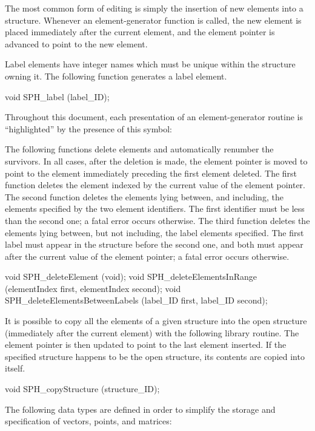\newpar
The most common form of editing is simply the insertion of new elements into a
structure.  Whenever an element-generator function is called, the new element
is placed immediately after the current element, and the element pointer is
advanced to point to the new element.

\newpar
Label elements have integer names which must be unique within the 
structure owning it.  The following function generates a label element.

\begincode
void SPH_label (label_ID);   \elementgenerator
\endcode

Throughout this document, each presentation of an element-generator routine is
``highlighted'' by the presence of this symbol:  \elementgenerator

\newpar
The following functions delete elements and automatically renumber the
survivors.  In all cases, after the deletion is made, the element pointer is
moved to point to the element immediately preceding the first element deleted.
The first function deletes the element indexed by the current value of the
element pointer.  The second function deletes the elements lying between, and
including, the elements specified by the two element identifiers.  The first
identifier must be less than the second one; a fatal error occurs otherwise.
The third function deletes the elements lying between, but not including, the
label elements specified.  The first label must appear in the structure before
the second one, and both must appear after the current value of the element
pointer; a fatal error occurs otherwise.

\begincode
void SPH_deleteElement (void);
void SPH_deleteElementsInRange (elementIndex first, elementIndex second);
void SPH_deleteElementsBetweenLabels (label_ID first, label_ID second);
\endcode

\newpar
It is possible to copy all the elements of a given structure into the
open structure (immediately after the current element) with the
following library routine.  The element pointer is then updated to
point to the last element inserted.  If the specified structure
happens to be the open structure, its contents are copied into itself.

\begincode
void SPH_copyStructure (structure_ID);
\endcode




The following data types are defined in order to simplify the storage and
specification of vectors, points, and matrices:


